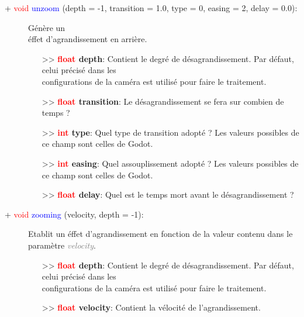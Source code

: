 \documentclass[a4paper, 11pt]{article}
\begin{document}
	\begin{description}
		\item [+ \textcolor{red}{void} \textcolor{blue}{unzoom} (depth = -1, transition = 1.0, type = 0, 
		easing = 2, delay = 0.0):] Génère un \\éffet d'agrandissement en arrière.
		\begin{itemize}
			\item [>> \textbf{\textcolor{red}{float} depth}:] Contient le degré de désagrandissement. Par 
			défaut, celui précisé dans les \\configurations de la caméra est utilisé pour faire le 
			traitement.
			\item[>> \textbf{\textcolor{red}{float} transition}:] Le désagrandissement se fera sur combien 
			de temps ?
			\item[>> \textbf{\textcolor{red}{int} type}:] Quel type de transition adopté ? Les valeurs 
			possibles de ce champ sont celles de Godot.
			\item[>> \textbf{\textcolor{red}{int} easing}:] Quel assouplissement adopté ? Les valeurs 
			possibles de ce champ sont celles de Godot.
			\item [>> \textbf{\textcolor{red}{float} delay}:] Quel est le temps mort avant le 
			désagrandissement ?\\
		\end{itemize}
	\end{description}
	\begin{description}
		\item [+ \textcolor{red}{void} \textcolor{blue}{zooming} (velocity, depth = -1):] Etablit un éffet
		d'agrandissement en fonction de la valeur contenu dans le paramètre \textit{\textcolor{gray}
		{velocity}}.
		\begin{itemize}
			\item [>> \textbf{\textcolor{red}{float} depth}:] Contient le degré de désagrandissement. Par 
			défaut, celui précisé dans les \\configurations de la caméra est utilisé pour faire le 
			traitement.
			\item [>> \textbf{\textcolor{red}{float} velocity}:] Contient la vélocité de l'agrandissement.\\
		\end{itemize}
	\end{description}
\end{document}
